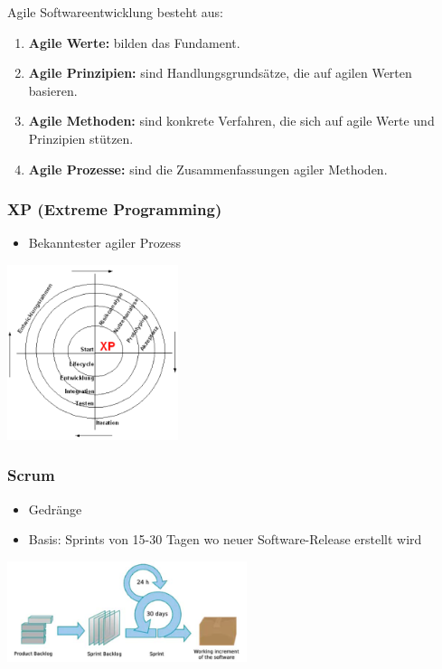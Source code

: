 Agile Softwareentwicklung besteht aus:
\begin{enumerate}
	\item \textbf{Agile Werte:} bilden das Fundament.
	\item \textbf{Agile Prinzipien:} sind Handlungsgrundsätze, die auf agilen Werten basieren.
	\item \textbf{Agile Methoden:} sind konkrete Verfahren, die sich auf agile Werte und Prinzipien stützen.
	\item \textbf{Agile Prozesse:} sind die Zusammenfassungen agiler Methoden.
	\\ 
\end{enumerate}

\begin{multicols}{2}
\subsubsection{XP (Extreme Programming)}
\begin{minipage}{10cm}
	\begin{itemize}
		\item Bekanntester agiler Prozess
	\end{itemize}
\end{minipage}
\begin{minipage}{5cm}
	\includegraphics[width=5cm]{images/extreme_programming.png}
\end{minipage}

\subsubsection{Scrum}
\begin{minipage}{10cm}
	\begin{itemize}
		\item Gedränge
		\item Basis: Sprints von 15-30 Tagen wo neuer Software-Release erstellt wird
	\end{itemize}
\end{minipage}
\begin{minipage}{7cm}
	\includegraphics[width=7cm]{images/scrum.png}
\end{minipage}
\\
\end{multicols}

